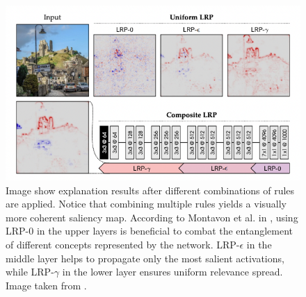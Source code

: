 \begin{figure}[!h]
    \begin{center}
    \begin{minipage}{1\textwidth}
      \includegraphics[width=\textwidth]{img/lrp-montavon.png}
    \end{minipage}
    \caption{Image show explanation results after different combinations of rules are applied. Notice that combining multiple rules yields a visually more coherent saliency map. According to Montavon et al. in \cite{lrp}, using LRP-$0$ in the upper layers is beneficial to combat the entanglement of different concepts represented by the network. LRP-$\epsilon$ in the middle layer helps to propagate only the most salient activations, while LRP-$\gamma$ in the lower layer ensures uniform relevance spread. Image taken from \cite{lrp}.}
    \label{fig:lrp-montavon}
    \end{center}
\end{figure}